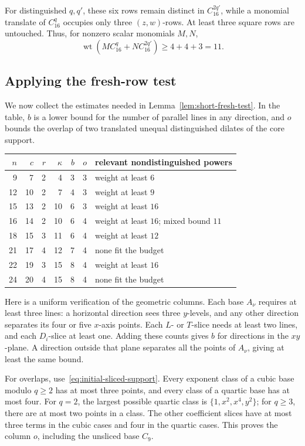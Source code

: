 \documentclass[11pt]{article}
\DeclareMathOperator{\wt}{wt}\DeclareMathOperator{\ord}{ord}
\numberwithin{equation}{section}
\theoremstyle{definition}\newtheorem{definition}[theorem]{Definition}
\theoremstyle{remark}\newtheorem{remark}[theorem]{Remark}
\begin{document}
For distinguished $q,q'$, these six rows remain distinct in
$C_{16}^{2q'}$, while a monomial translate of $C_{16}^q$ occupies
only three $(z,w)$-rows. At least three square rows are untouched.
Thus, for nonzero scalar monomials $M,N$,
\begin{equation}\label{eq:initial-sixteen-mixed}
 \wt(MC_{16}^q+NC_{16}^{2q'})\ge4+4+3=11.
\end{equation}

\subsection{Applying the fresh-row test}

We now collect the estimates needed in Lemma~\ref{lem:short-fresh-test}.
In the table, $b$ is a lower bound for the number of parallel lines in
any direction, and $o$ bounds the overlap of two translated unequal
distinguished dilates of the core support.
\begin{center}\small
\begin{tabular}{r|rrrrr|l}
\toprule
$n$&$c$&$r$&$\kappa$&$b$&$o$&
relevant nondistinguished powers\\\midrule
9&7&2&4&3&3&weight at least $6$\\
12&10&2&7&4&3&weight at least $9$\\
15&13&2&10&6&3&weight at least $16$\\
16&14&2&10&6&4&weight at least $16$; mixed bound $11$\\
18&15&3&11&6&4&weight at least $12$\\
21&17&4&12&7&4&none fit the budget\\
22&19&3&15&8&4&weight at least $16$\\
24&20&4&15&8&4&none fit the budget\\
\bottomrule
\end{tabular}
\end{center}
Here is a uniform verification of the geometric columns.
Each base $A_\nu$ requires at least three lines: a horizontal direction
sees three $y$-levels, and any other direction separates its four or five
$x$-axis points. Each $L$- or $T$-slice needs at least two lines, and
each $D_i$-slice at least one. Adding these counts gives $b$ for
directions in the $xy$-plane. A direction outside that plane separates
all the points of $A_\nu$, giving at least the same bound.

For overlaps, use~\eqref{eq:initial-sliced-support}. Every exponent
class of a cubic base modulo $q\ge2$ has at most three points, and
every class of a quartic base has at most four. For $q=2$, the largest
possible quartic class is $\{1,x^2,x^4,y^2\}$; for $q\ge3$,
there are at most two points in a class. The other coefficient slices
have at most three terms in the cubic cases and four in the quartic
cases. This proves the column $o$, including the unsliced base $C_9$.
\end{document}
